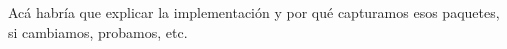 Acá habría que explicar la implementación y por qué capturamos esos paquetes, si cambiamos, probamos, etc.
